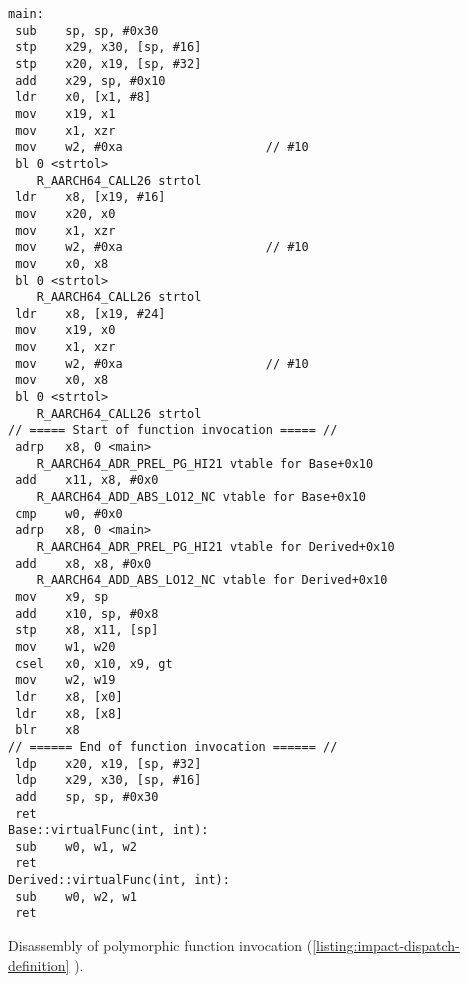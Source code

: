 \vspace{2em}
\begin{code}
    \begin{verbatim}
main:
 sub	sp, sp, #0x30
 stp	x29, x30, [sp, #16]
 stp	x20, x19, [sp, #32]
 add	x29, sp, #0x10
 ldr	x0, [x1, #8]
 mov	x19, x1
 mov	x1, xzr
 mov	w2, #0xa                   	// #10
 bl	0 <strtol>
    R_AARCH64_CALL26 strtol
 ldr	x8, [x19, #16]
 mov	x20, x0
 mov	x1, xzr
 mov	w2, #0xa                   	// #10
 mov	x0, x8
 bl	0 <strtol>
    R_AARCH64_CALL26 strtol
 ldr	x8, [x19, #24]
 mov	x19, x0
 mov	x1, xzr
 mov	w2, #0xa                   	// #10
 mov	x0, x8
 bl	0 <strtol>
    R_AARCH64_CALL26 strtol
// ===== Start of function invocation ===== //
 adrp	x8, 0 <main>
    R_AARCH64_ADR_PREL_PG_HI21 vtable for Base+0x10
 add	x11, x8, #0x0
    R_AARCH64_ADD_ABS_LO12_NC vtable for Base+0x10
 cmp	w0, #0x0
 adrp	x8, 0 <main>
    R_AARCH64_ADR_PREL_PG_HI21 vtable for Derived+0x10
 add	x8, x8, #0x0
    R_AARCH64_ADD_ABS_LO12_NC vtable for Derived+0x10
 mov	x9, sp
 add	x10, sp, #0x8
 stp	x8, x11, [sp]
 mov	w1, w20
 csel	x0, x10, x9, gt
 mov	w2, w19
 ldr	x8, [x0]
 ldr	x8, [x8]
 blr	x8
// ====== End of function invocation ====== //
 ldp	x20, x19, [sp, #32]
 ldp	x29, x30, [sp, #16]
 add	sp, sp, #0x30
 ret
Base::virtualFunc(int, int):
 sub	w0, w1, w2
 ret
Derived::virtualFunc(int, int):
 sub	w0, w2, w1
 ret
    \end{verbatim}
    \caption{Disassembly of polymorphic function invocation (\autoref{listing:impact-dispatch-definition} ).}
    \label{listing:impact-dispatch-polymorphic-disassembly}
\end{code}


